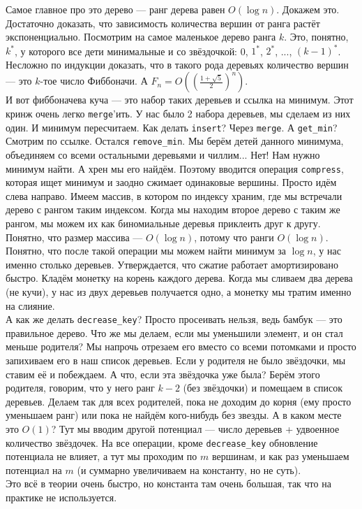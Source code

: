 \documentclass{article}
\newcommand{\pseudo}{PseudoLexer.py:PseudoLexer -x}
\newcommand{\pseudocode}[1]{\texttt{#1}}
\begin{document}
    Самое главное про это дерево --- ранг дерева равен $O(\log n)$. Докажем это. Достаточно доказать, что зависимость количества вершин от ранга растёт экспоненциально. Посмотрим на самое маленькое дерево ранга $k$. Это, понятно, $k^*$, у которого все дети минимальные и со звёздочкой: 0, $1^*$, $2^*$, ..., $(k-1)^*$. Несложно по индукции доказать, что в такого рода деревьях количество вершин --- это $k$-тое число Фиббоначи. А $F_n=O\left(\left(\frac{1+\sqrt5}2\right)^n\right)$.\\
    И вот фиббоначева куча --- это набор таких деревьев и ссылка на минимум. Этот кринж очень легко \pseudocode{merge}'ить. У нас было 2 набора деревьев, мы сделаем из них один. И минимум пересчитаем. Как делать \pseudocode{insert}? Через \pseudocode{merge}. А \pseudocode{get_min}? Смотрим по ссылке. Остался \pseudocode{remove_min}. Мы берём детей данного минимума, объединяем со всеми остальными деревьями и чиллим... Нет! Нам нужно минимум найти. А хрен мы его найдём. Поэтому вводится операция \pseudocode{compress}, которая ищет минимум и заодно сжимает одинаковые вершины. Просто идём слева направо. Имеем массив, в котором по индексу храним, где мы встречали дерево с рангом таким индексом. Когда мы находим второе дерево с таким же рангом, мы можем их как биномиальные деревья приклеить друг к другу. Понятно, что размер массива --- $O(\log n)$, потому что ранги $O(\log n)$. Понятно, что после такой операции мы можем найти минимум за $\log n$, у нас именно столько деревьев. Утверждается, что сжатие работает амортизировано быстро. Кладём монетку на корень каждого дерева. Когда мы сливаем два дерева (не кучи), у нас из двух деревьев получается одно, а монетку мы тратим именно на слияние.\\
    А как же делать \pseudocode{decrease_key}? Просто просеивать нельзя, ведь бамбук --- это правильное дерево. Что же мы делаем, если мы уменьшили элемент, и он стал меньше родителя? Мы напрочь отрезаем его вместо со всеми потомками и просто запихиваем его в наш список деревьев. Если у родителя не было звёздочки, мы ставим её и побеждаем. А что, если эта звёздочка уже была? Берём этого родителя, говорим, что у него ранг $k-2$ (без звёздочки) и помещаем в список деревьев. Делаем так для всех родителей, пока не доходим до корня (ему просто уменьшаем ранг) или пока не найдём кого-нибудь без звезды. А в каком месте это $O(1)$? Тут мы вводим другой потенциал --- число деревьев + удвоенное количество звёздочек. На все операции, кроме \pseudocode{decrease_key} обновление потенциала не влияет, а тут мы проходим по $m$ вершинам, и как раз уменьшаем потенциал на $m$ (и суммарно увеличиваем на константу, но не суть).\\
    Это всё в теории очень быстро, но константа там очень большая, так что на практике не используется.
\end{document}

